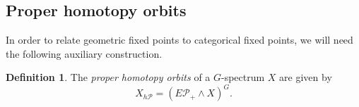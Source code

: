 \documentclass[11pt]{amsart}
\newtheorem{proposition}[equation]{Proposition}
\theoremstyle{definition}
\newtheorem{definition}[equation]{Definition}
\newtheorem{remark}[equation]{Remark}
\numberwithin{equation}{subsection} %
\def\z{\mathbb{Z}}
\def\uM{\underline{M}}
\def\uA{\underline{A}}
\def\uM{\underline{M}}
\def\mfz{\underline{\mathbb{Z}}}
\begin{document}






\subsection{Proper homotopy orbits}\label{SS:PHO}

In order to relate geometric fixed points to categorical fixed points, we will need the following auxiliary construction.

\begin{definition}
The \emph{proper homotopy orbits} of a $G$-spectrum $X$ are given by
$$X_{h\mathcal{P}} = (E\mathcal{P}_+ \wedge X)^G.$$
\end{definition}
\end{document}
